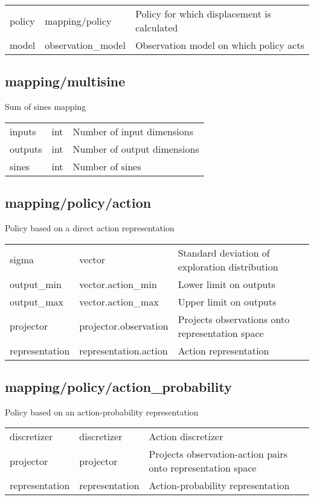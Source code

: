 \noindent\begin{tabular}{@{}lll@{}}
policy&mapping/policy&Policy for which displacement is calculated\\
model&observation\_model&Observation model on which policy acts\\
\end{tabular}
\subsection{mapping/multisine}
\noindent Sum of sines mapping\\

\noindent\begin{tabular}{@{}lll@{}}
inputs&int&Number of input dimensions\\
outputs&int&Number of output dimensions\\
sines&int&Number of sines\\
\end{tabular}
\subsection{mapping/policy/action}
\noindent Policy based on a direct action representation\\

\noindent\begin{tabular}{@{}lll@{}}
sigma&vector&Standard deviation of exploration distribution\\
output\_min&vector.action\_min&Lower limit on outputs\\
output\_max&vector.action\_max&Upper limit on outputs\\
projector&projector.observation&Projects observations onto representation space\\
representation&representation.action&Action representation\\
\end{tabular}
\subsection{mapping/policy/action\_probability}
\noindent Policy based on an action-probability representation\\

\noindent\begin{tabular}{@{}lll@{}}
discretizer&discretizer&Action discretizer\\
projector&projector&Projects observation-action pairs onto representation space\\
representation&representation&Action-probability representation\\
\end{tabular}
